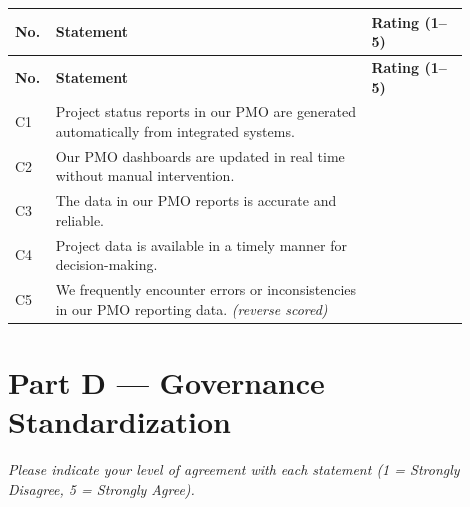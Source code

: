 {\singlespacing
\begin{longtable}{@{} p{0.05\linewidth} p{0.65\linewidth} p{0.20\linewidth} @{}}
\toprule
\textbf{No.} & \textbf{Statement} & \textbf{Rating (1--5)}\\
\midrule
\endfirsthead
\toprule
\textbf{No.} & \textbf{Statement} & \textbf{Rating (1--5)}\\
\midrule
\endhead
\bottomrule
\endfoot
C1 & Project status reports in our PMO are generated automatically from
   integrated systems.
   & \underline{\hspace{2cm}}\\[6pt]
C2 & Our PMO dashboards are updated in real time without manual intervention.
   & \underline{\hspace{2cm}}\\[6pt]
C3 & The data in our PMO reports is accurate and reliable.
   & \underline{\hspace{2cm}}\\[6pt]
C4 & Project data is available in a timely manner for decision-making.
   & \underline{\hspace{2cm}}\\[6pt]
C5 & We frequently encounter errors or inconsistencies in our PMO reporting
   data. \textit{(reverse scored)}
   & \underline{\hspace{2cm}}\\
\end{longtable}
}

\section*{Part D --- Governance Standardization}

\noindent\textit{Please indicate your level of agreement with each statement
(1 = Strongly Disagree, 5 = Strongly Agree).}

\bigskip

